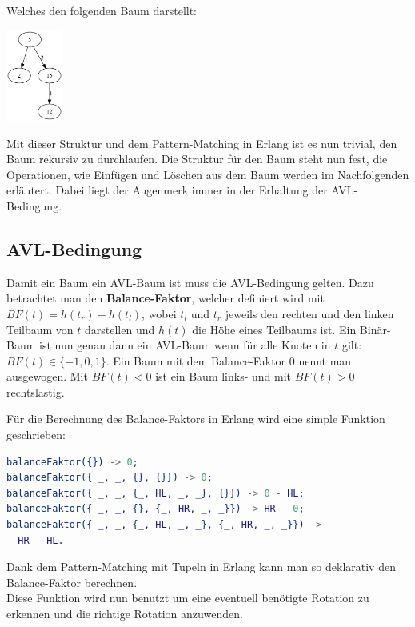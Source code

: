 \documentclass{article}
\begin{document}
   	Welches den folgenden Baum darstellt:

	\begin{center}
   	\includegraphics[height=3cm]{1.png}
	\end{center}

	Mit dieser Struktur und dem Pattern-Matching in Erlang ist es nun trivial, den Baum rekursiv zu durchlaufen. Die Struktur für den Baum steht nun fest, die Operationen, wie Einfügen und Löschen aus dem Baum werden im Nachfolgenden erläutert. Dabei liegt der Augenmerk immer in der Erhaltung der AVL-Bedingung.

	\subsection{AVL-Bedingung}
	\label{sec:avl-crit}

	Damit ein Baum ein AVL-Baum ist muss die AVL-Bedingung gelten. Dazu betrachtet man den \textbf{Balance-Faktor}, welcher definiert wird mit \\ $BF(t) = h(t_r) - h(t_l)$, wobei $t_l$ und $t_r$ jeweils den rechten und den linken Teilbaum von $t$ darstellen und $h(t)$ die Höhe eines Teilbaums ist.
	Ein Binär-Baum ist nun genau dann ein AVL-Baum wenn für alle Knoten in $t$ gilt: $BF(t) \in \{-1,0,1\}$. Ein Baum mit dem Balance-Faktor 0 nennt man ausgewogen. Mit $BF(t) < 0$ ist ein Baum links- und mit $BF(t) > 0$ rechtslastig.
	
	Für die Berechnung des Balance-Faktors in Erlang wird eine simple Funktion geschrieben:
	
	\begin{lstlisting}[language=erlang]
balanceFaktor({}) -> 0;
balanceFaktor({ _, _, {}, {}}) -> 0;
balanceFaktor({ _, _, {_, HL, _, _}, {}}) -> 0 - HL;
balanceFaktor({ _, _, {}, {_, HR, _, _}}) -> HR - 0;
balanceFaktor({ _, _, {_, HL, _, _}, {_, HR, _, _}}) -> 
  HR - HL.
	\end{lstlisting}
	
	Dank dem Pattern-Matching mit Tupeln in Erlang kann man so deklarativ den Balance-Faktor berechnen. \\
	Diese Funktion wird nun benutzt um eine eventuell benötigte Rotation zu erkennen und die richtige Rotation anzuwenden.
	
\end{document}
